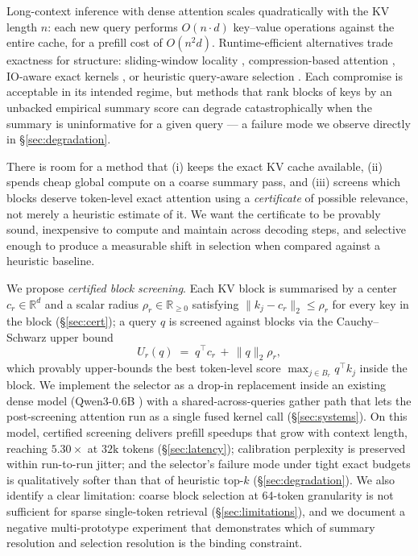 \documentclass[11pt]{article}
\theoremstyle{plain}
\theoremstyle{definition}
\newcommand{\R}{\mathbb{R}}
\newcommand{\ur}{U_r}
\newcommand{\normq}{\lVert q \rVert_2}
\newcommand{\rad}{\rho_r}
\begin{document}
Long-context inference with dense attention scales quadratically with the KV
length $n$: each new query performs $O(n \cdot d)$ key--value operations
against the entire cache, for a prefill cost of $O(n^2 d)$. Runtime-efficient
alternatives trade exactness for structure: sliding-window locality
\citep{beltagy2020longformer, zaheer2020bigbird}, compression-based attention
\citep{wang2020linformer}, IO-aware exact kernels
\citep{dao2022flashattention}, or heuristic query-aware selection
\citep{tang2024quest, jiang2024minference, fu2024lazyllm}. Each compromise is
acceptable in its intended regime, but methods that rank blocks of keys by
an unbacked empirical summary score can degrade catastrophically when the
summary is uninformative for a given query --- a failure mode we observe
directly in \S\ref{sec:degradation}.

There is room for a method that (i) keeps the exact KV cache available, (ii)
spends cheap global compute on a coarse summary pass, and (iii) screens
which blocks deserve token-level exact attention using a \emph{certificate}
of possible relevance, not merely a heuristic estimate of it. We want the
certificate to be provably sound, inexpensive to compute and maintain
across decoding steps, and selective enough to produce a measurable shift
in selection when compared against a heuristic baseline.

We propose \emph{certified block screening}. Each KV block is summarised by
a center $c_r \in \R^{d}$ and a scalar radius $\rad \in \R_{\ge 0}$
satisfying $\|k_j - c_r\|_2 \le \rad$ for every key in the block (\S\ref{sec:cert});
a query $q$ is screened against blocks via the Cauchy--Schwarz upper bound
\[
\ur(q) \;=\; q^{\top} c_r \,+\, \normq \rad,
\]
which provably upper-bounds the best token-level score $\max_{j \in B_r} q^{\top} k_j$
inside the block. We implement the selector as a drop-in replacement inside
an existing dense model (Qwen3-0.6B \citep{qwen3}) with a shared-across-queries
gather path that lets the post-screening attention run as a single fused
kernel call (\S\ref{sec:systems}). On this model, certified screening
delivers prefill speedups that grow with context length, reaching $5.30\times$
at $32\mathrm{k}$ tokens (\S\ref{sec:latency}); calibration perplexity is
preserved within run-to-run jitter; and the selector's failure mode under
tight exact budgets is qualitatively softer than that of heuristic top-$k$
(\S\ref{sec:degradation}). We also identify a clear limitation: coarse
block selection at 64-token granularity is not sufficient for sparse
single-token retrieval (\S\ref{sec:limitations}), and we document a
negative multi-prototype experiment that demonstrates which of summary
resolution and selection resolution is the binding constraint.
\end{document}
